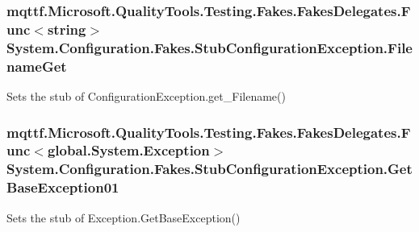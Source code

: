 \hypertarget{class_system_1_1_configuration_1_1_fakes_1_1_stub_configuration_exception_abe0d4d141a8b3a4d0f6a5823b59a5f48}{
\subsubsection[{Filename\-Get}]{\setlength{\rightskip}{0pt plus 5cm}mqttf.\-Microsoft.\-Quality\-Tools.\-Testing.\-Fakes.\-Fakes\-Delegates.\-Func$<$string$>$ System.\-Configuration.\-Fakes.\-Stub\-Configuration\-Exception.\-Filename\-Get}}\label{class_system_1_1_configuration_1_1_fakes_1_1_stub_configuration_exception_abe0d4d141a8b3a4d0f6a5823b59a5f48}


Sets the stub of Configuration\-Exception.\-get\-\_\-\-Filename()

\hypertarget{class_system_1_1_configuration_1_1_fakes_1_1_stub_configuration_exception_a7c0c376b4fa0cdad18dcc30c8b811277}{
\subsubsection[{Get\-Base\-Exception01}]{\setlength{\rightskip}{0pt plus 5cm}mqttf.\-Microsoft.\-Quality\-Tools.\-Testing.\-Fakes.\-Fakes\-Delegates.\-Func$<$global.\-System.\-Exception$>$ System.\-Configuration.\-Fakes.\-Stub\-Configuration\-Exception.\-Get\-Base\-Exception01}}\label{class_system_1_1_configuration_1_1_fakes_1_1_stub_configuration_exception_a7c0c376b4fa0cdad18dcc30c8b811277}


Sets the stub of Exception.\-Get\-Base\-Exception()

